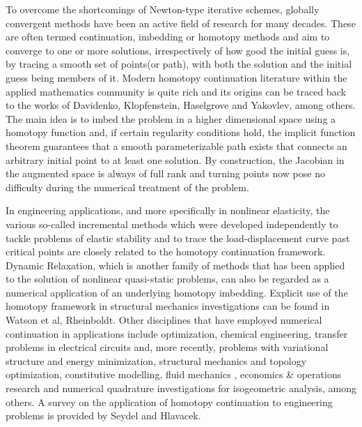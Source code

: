 To overcome the shortcomings of Newton-type iterative schemes, 
globally convergent methods have been an active field of research for many
decades\cite{Allgower:2003}. These are often termed continuation, imbedding or 
homotopy methods\cite{Rheinboldt:2000} and aim to converge to one or more 
solutions, irrespectively of how good the initial guess is, by tracing a smooth
set of points(or path), with both the solution and the initial guess being
members of it. Modern homotopy continuation literature within the applied
mathematics community is quite
rich\cite{Keller:1978,Li:1980,Chow:1978,Chow:1979,Watson:1989,Watson:1990,Allgower:1981,Rheinboldt:1980,Rheinboldt:1983,Wayburn:1987}
and its origins can be traced back to the works of
Davidenko\cite{Davidenko:1953a,Davidenko:1953},
Klopfenstein\cite{Klopfenstein:1961},
Haselgrove\cite{Haselgrove:1961} and Yakovlev\cite{Yakovlev:1964}, among others.
The main idea is to imbed the problem in a higher dimensional space using a
homotopy function and, if 
certain regularity conditions hold, the implicit function theorem guarantees that a
smooth parameterizable path exists that connects an arbitrary initial point 
to at least 
one solution. By construction, the Jacobian in the augmented space is always of
full rank and turning points now pose no difficulty during the numerical
treatment of the problem.

In engineering applications, and more specifically in nonlinear elasticity, the 
various so-called incremental methods which were developed independently to tackle 
problems 
of elastic stability and to trace the load-displacement curve past critical
points\cite{Wempner:1971,Bergan:1978,Bergan:1978b,Batoz:1979,Riks:1979,Ramm:1981,Crisfield3}
are closely related to the homotopy continuation framework\cite{Rheinboldt:1983}. 
Dynamic Relaxation,
which is another family of
methods that has been applied to the solution of nonlinear quasi-static
problems\cite{Cassell:1970,Brew:1971,Stricklin:1971,Papadrakakis:1981,Park:1982},
can also be regarded as a numerical application of an underlying homotopy
imbedding\cite{Oden:1973}. Explicit use of the homotopy framework in structural
mechanics investigations can be found in Watson et 
al\cite{Watson:1981report,Watson:1985},
Rheinboldt\cite{Rheinboldt:1981}. Other disciplines that have employed numerical
continuation in applications include
optimization\cite{Poore:1988,Watson:1989,Zhenghua:1996,Hillermeier:2001,Song:2008},
chemical engineering\cite{Byrne:1985,Lin:1987,Kovach:1987}, transfer problems
in electrical circuits\cite{Ushida:1984} and, more recently, problems with 
variational structure and energy
minimization\cite{Hughes:2013,Mehta:2015,Mobahi:2015}, structural
mechanics\cite{Bilasse:2009,Banerjee:2013,Ligursky:2014,Sideris:2017,Groh:2018} and 
topology
optimization\cite{Chakraborty:2019}, constitutive modelling\cite{Tari:2017}, fluid 
mechanics\cite{Yu:2016,Brown:2016}
, economics \& operations
research\cite{Borkovsky:2010,Besanko:2010,Herings:2010} and numerical quadrature
investigations for isogeometric analysis\cite{Bartovn:2016,Barendrecht:2018}, among 
others. A survey on the 
application of homotopy continuation to engineering problems is provided by 
Seydel and Hlavacek\cite{Seydel:1987}.


